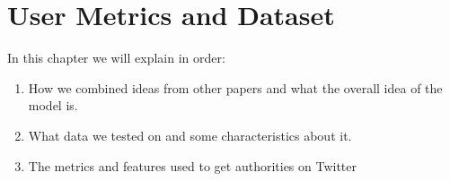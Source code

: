\chapter{User Metrics and Dataset}
\label{sec:metrics-dataset}

%


%


In this chapter we will explain in order:
\begin{enumerate}
	\item How we combined ideas from other papers and what the overall idea of the model is.
    \item What data we tested on and some characteristics about it.
    \item The metrics and features used to get authorities on Twitter
\end{enumerate}


